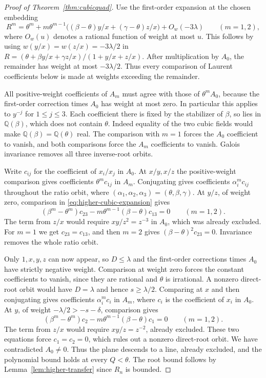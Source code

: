 \documentclass[11pt,a4paper,reqno]{amsart}
\theoremstyle{definition}
\theoremstyle{remark}
\numberwithin{equation}{section}
\begin{document}
\begin{proof}[Proof of Theorem~\ref{thm:cubicquad}]
Use the first-order expansion at the chosen embedding
\begin{equation}\label{eq:higher-cubic-expansion}
 R^m=\theta^m+
  m\theta^{m-1}\bigl((\beta-\theta)y/x+(\gamma-\theta)z/x\bigr)
  +O_w(-3\lambda)\qquad(m=1,2),
\end{equation}
where \(O_w(u)\) denotes a rational function of
weight at most \(u\). This follows by using
\(w(y/x)=w(z/x)=-3\lambda/2\) in
\(R=(\theta+\beta y/x+\gamma z/x)/(1+y/x+z/x)\).
After multiplication by \(A_0\), the remainder
has weight at most \(-3\lambda/2\). Thus every
comparison of Laurent coefficients below is made
at weights exceeding the remainder.

All positive-weight coefficients of \(A_m\) must
agree with those of \(\theta^m A_0\), because the
first-order correction times \(A_0\) has weight
at most zero. In particular this applies to \(y^{-j}\)
for \(1\le j\le3\). Each coefficient there is fixed
by the stabilizer of \(\beta\), so lies in
\(\mathbb Q(\beta)\), which does not contain \(\theta\).
Indeed equality of the two cubic fields would
make \(\mathbb Q(\beta)=\mathbb Q(\theta)\) real.
The comparison with \(m=1\) forces the \(A_0\)
coefficient to vanish, and both comparisons
force the \(A_m\) coefficients to vanish. Galois
invariance removes all three inverse-root orbits.

Write \(c_{ij}\) for the coefficient of \(x_i/x_j\)
in \(A_0\). At \(x/y,x/z\) the positive-weight
comparison gives coefficients \(\theta^m c_{1j}\)
in \(A_m\). Conjugating gives coefficients
\(\alpha_i^m c_{ij}\) throughout the ratio orbit,
where \((\alpha_1,\alpha_2,\alpha_3)=(\theta,\beta,\gamma)\).
At \(y/z\), of weight zero, comparison in
\eqref{eq:higher-cubic-expansion} gives
\[
 (\beta^m-\theta^m)c_{23}
 -m\theta^{m-1}(\beta-\theta)c_{13}=0
 \qquad(m=1,2).
\]
The term from \(z/x\) would require \(xy/z^2=z^{-3}\)
in \(A_0\), which was already excluded. For \(m=1\)
we get \(c_{23}=c_{13}\), and then \(m=2\) gives
\((\beta-\theta)^2c_{23}=0\). Invariance removes
the whole ratio orbit.

Only \(1,x,y,z\) can now appear, so \(D\le\lambda\)
and the first-order corrections times \(A_0\)
have strictly negative weight. Comparison at
weight zero forces the constant coefficients
to vanish, since they are rational and
\(\theta\) is irrational. A nonzero direct-root
orbit would have \(D=\lambda\) and hence
\(s\ge\lambda/2\). Comparing at \(x\) and then
conjugating gives coefficients \(\alpha_i^m c_i\)
in \(A_m\), where \(c_i\) is the coefficient
of \(x_i\) in \(A_0\). At \(y\), of weight
\(-\lambda/2>-s-\delta\), comparison gives
\[
 (\beta^m-\theta^m)c_2
 -m\theta^{m-1}(\beta-\theta)c_1=0
 \qquad(m=1,2).
\]
The term from \(z/x\) would require \(xy/z=z^{-2}\),
already excluded. These two equations force
\(c_1=c_2=0\), which rules out a nonzero direct-root
orbit. We have contradicted \(A_0\ne0\).
Thus the plane descends to a line, already
excluded, and the polynomial bound holds at
every \(Q<\theta\). The root bound follows by
Lemma~\ref{lem:higher-transfer} since \(R_n\)
is bounded.


\end{proof}
\end{document}
